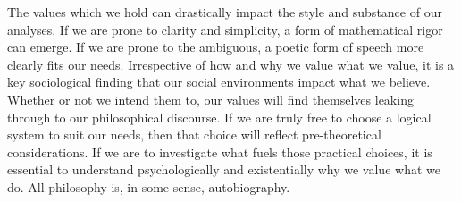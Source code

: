 \documentclass[leqno, 12pt]{turabian-researchpaper}
\begin{document}
	The values which we hold can drastically impact the style and substance of our
	analyses. If we are prone to clarity and simplicity, a form of mathematical rigor
	can emerge. If we are prone to the ambiguous, a poetic form of speech more clearly
	fits our needs. Irrespective of how and why we value what we value, it is a key
	sociological finding that our social environments impact what we believe.
	Whether or not we intend them to, our values will find themselves leaking through
	to our philosophical discourse. If we are truly free to choose a logical
	system to suit our needs, then that choice will reflect pre-theoretical considerations.
	If we are to investigate what fuels those practical choices, it is essential to
	understand psychologically and existentially why we value what we do. All
	philosophy is, in some sense, autobiography.

	\centerline{} \break

	\printbibliography
\end{document}
